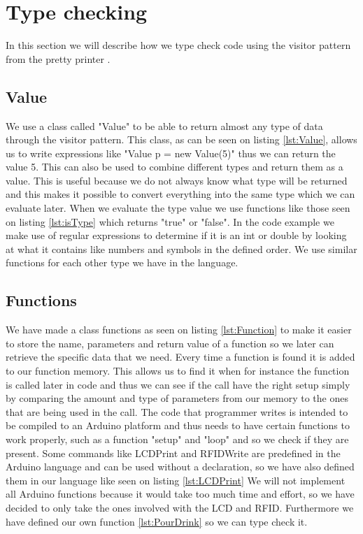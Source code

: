 \section{Type checking}
In this section we will describe how we type check code using the visitor pattern from the pretty printer .

\subsection*{Value}
We use a class called "Value" to be able to return almost any type of data through the visitor pattern.
This class, as can be seen on listing \ref{lst:Value}, allows us to write expressions like "Value p = new Value(5)" thus we can return the value 5. This can also be used to combine different types and return them as a value. This is useful because we do not always know what type will be returned and this makes it possible to convert everything into the same type which we can evaluate later.
When we evaluate the type value we use functions like those seen on listing \ref{lst:isType} which returns "true" or "false". In the code example we make use of regular expressions to determine if it is an int or double by looking at what it contains like numbers and symbols in the defined order. We use similar functions for each other type we have in the language.

\subsection*{Functions}
We have made a class functions as seen on listing \ref{lst:Function} to make it easier to store the name, parameters and return value of a function so we  later can retrieve the specific data that we need. Every time a function is found it is added to our function memory. This allows us to find it when for instance the function is called later in code and thus we can see if the call have the right setup simply by comparing the amount and type of parameters from our memory to the ones that are being used in the call.
The code that programmer writes is intended to be compiled to an Arduino platform and thus needs to have certain functions to work properly, such as a function "setup" and "loop" and so we check if they are present. Some commands like LCDPrint and RFIDWrite are predefined in the Arduino language and can be used without a declaration, so we have also defined them in our language like seen on listing \ref{lst:LCDPrint}
We will not implement all Arduino functions because it would take too much time and effort, so we have decided to only take the ones involved with the LCD and RFID. Furthermore we have defined our own function \ref{lst:PourDrink} so we can type check it.

